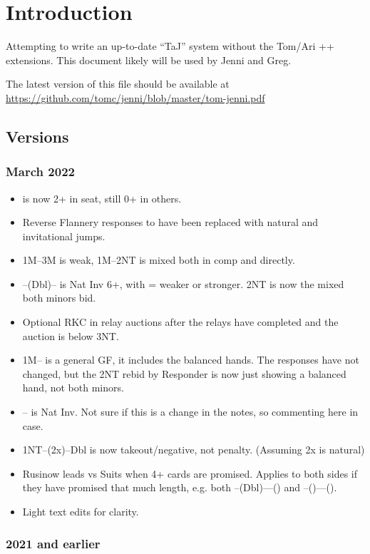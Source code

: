 \documentclass[tom-jenni]{subfile}
\begin{document}
\chapter{Introduction}

Attempting to write an up-to-date ``TaJ'' system without the Tom/Ari ++ extensions.  This document likely will be used by Jenni and Greg.

The latest version of this file should be available at \url{https://github.com/tomc/jenni/blob/master/tom-jenni.pdf}

\section{Versions}

\subsection{March 2022}

\begin{itemize}
	\item {} is now 2+ in \third seat, still 0+ in others.
	\item Reverse Flannery responses to  have been replaced with natural and invitational jumps.
	\item 1M--3M is weak, 1M--2NT is mixed both in comp and directly.
	\item {}--(Dbl)-- is Nat Inv 6+, with  = weaker or stronger.  2NT is now the mixed both minors bid.
	\item Optional RKC in relay auctions after the relays have completed and the auction is below 3NT.
	\item 1M-- is a general GF, it includes the balanced hands.  The responses have not changed, but the 2NT rebid by Responder is now just showing a balanced hand, not both minors.
	\item {}-- is Nat Inv.  Not sure if this is a change in the notes, so commenting here in case.
	\item 1NT--(2x)--Dbl is now takeout/negative, not penalty.  (Assuming 2x is natural)
	\item Rusinow leads vs Suits when 4+ cards are promised.  Applies to both sides if they have promised that much length, e.g. both --(Dbl)----() and --()----().
	\item Light text edits for clarity.
\end{itemize}

\subsection{2021 and earlier}
\end{document}
